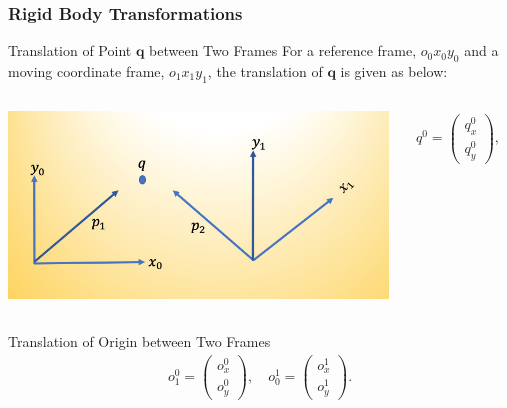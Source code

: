 \begin{frame}
	\frametitle{Rigid Body Transformations}
	\begin{block}{Translation of Point $\bm{q}$ between Two Frames}
		For a reference frame, $o_0 x_0 y_0$ and a moving coordinate frame, $o_1 x_1 y_1$, the translation of $\bm{q}$ is given as below:
	\end{block}
	\begin{columns}[]
		\begin{column}{.5\linewidth}
			\centering
			\includegraphics[width=\textwidth]{../Notes/figures/trans_coords.jpg}
		\end{column}
		\begin{column}{.5\linewidth}
			\begin{align}
				q^0 = \left( \begin{array}{c}
					q^0_x \\ q_y^0
				\end{array}
				\right), \quad
				q^1 = \left( \begin{array}{c}
					q^1_x \\ q_y^1
				\end{array}
				\right) \nonumber
			\end{align}
		\end{column}
	\end{columns}
	\begin{block}{Translation of Origin between Two Frames}
		\begin{align}
			o^0_1 = \left( \begin{array}{c}
				o^0_x \\ o^0_y
			\end{array}
			\right), \quad
			o^1_0 = \left( \begin{array}{c}
				o^1_x \\ o^1_y
			\end{array}
			\right).
		\end{align}
	\end{block}
\end{frame}

